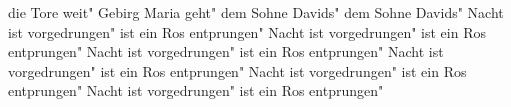 \ifx\mxversion\undefined
  
  
  
  
\fi

%
\tableofcontents
\normalmusicsize
 die Tore weit"
 Gebirg Maria geht"
 dem Sohne Davids"
 dem Sohne Davids"
 Nacht ist vorgedrungen"
 ist ein Ros entprungen"
 Nacht ist vorgedrungen"
 ist ein Ros entprungen"
 Nacht ist vorgedrungen"
 ist ein Ros entprungen"
 Nacht ist vorgedrungen"
 ist ein Ros entprungen"
 Nacht ist vorgedrungen"
 ist ein Ros entprungen"
 Nacht ist vorgedrungen"
 ist ein Ros entprungen"

\bookbye